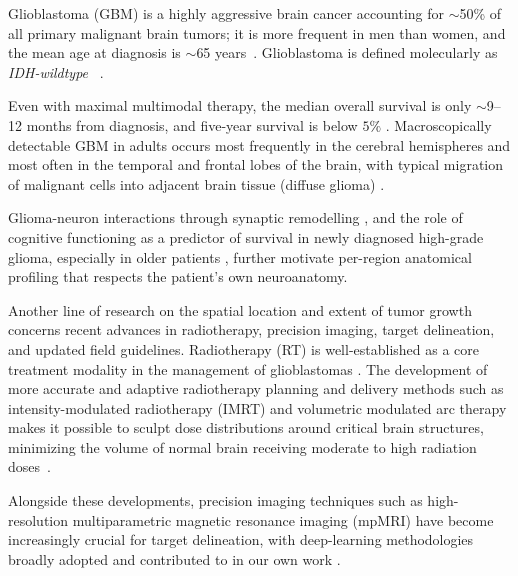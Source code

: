 \documentclass[a4paper,11pt,leqno]{article}
\begin{document}
Glioblastoma (GBM) is a highly aggressive brain cancer accounting for $\sim$50\% of all primary malignant brain tumors; it is more frequent in men than women, and the mean age at diagnosis is $\sim$65 years~\cite{Grochans2022,Schaff2023}. %
Glioblastoma is defined molecularly as \emph{IDH-wildtype}
~\cite{Louis2021,Stoyanov2022,Whitfield2022}.   %

Even with maximal multimodal therapy, the median overall survival is only $\sim$9--12 months from diagnosis, and five-year survival is below $5\%$ \cite{Grochans2022,Schaff2023,Blakstad2023}. Macroscopically detectable GBM in adults occurs most frequently in the cerebral hemispheres and most often in the temporal and frontal lobes of the brain, with typical migration of malignant cells into adjacent brain tissue (diffuse glioma) \cite{Larjavaara2007}.

Glioma-neuron interactions through synaptic remodelling
\cite{Krishna2023,Ibrahim2023}, and the role of cognitive functioning as
a predictor of survival in newly diagnosed high-grade glioma, especially
in older patients \cite{Klein2003,vanKessel2021,Kong2016}, further
motivate per-region anatomical profiling that respects the patient's
own neuroanatomy.

Another line of research on the spatial location and extent of tumor growth concerns recent advances in radiotherapy, precision imaging, target delineation, and updated field guidelines. Radiotherapy (RT) is well-established as a core treatment modality in the management of glioblastomas \cite{Walker1979,Weller2021}. %
The development of more accurate and adaptive radiotherapy planning and delivery methods such as intensity-modulated radiotherapy (IMRT) and volumetric modulated arc therapy makes it possible to sculpt dose distributions around critical brain structures, minimizing the volume of normal brain receiving moderate to high radiation doses~\cite{Niyazi2023,Palma2019}.

Alongside these developments, precision imaging techniques such as
high-resolution multiparametric magnetic resonance imaging (mpMRI)
\cite{Eidex2023,Ellingson2015,Niyazi2023,Thust2018,Tseng2020} have
become increasingly crucial for target delineation, with deep-learning
methodologies broadly adopted \cite{Wiestler2020} and contributed to in
our own work \cite{Alam2021,Hannisdal2023a,Hannisdal2026,Lundervold2019,Kaliyugarasan2023}.
\end{document}
